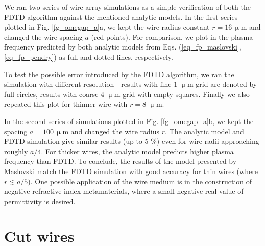We ran two series of wire array simulations as a simple verification of both the FDTD algorithm against the mentioned analytic models. In the first series plotted in Fig. \ref{fg_omegap_a}a, we kept the wire radius constant $r = 16\,\upmu$m  and changed the wire spacing $a$ (red points). For comparison, we plot in the plasma frequency predicted by both analytic models from Eqs. (\ref{eq_fp_maslovski}, \ref{eq_fp_pendry}) as full and dotted lines, respectively. 

To test the possible error introduced by the FDTD algorithm, we ran the simulation with different resolution - results with fine $1$ $\upmu$m grid are denoted by full circles, results with coarse $4$ $\upmu$m grid with empty squares. Finally we also repeated this plot for thinner wire with $r = 8$ $\upmu$m. %

In the second series of simulations plotted in Fig.  \ref{fg_omegap_a}b, we kept the spacing $a = 100\,\upmu$m and changed the wire radius $r$. The analytic model and FDTD simulation give similar results (up to 5 \%) even for wire radii approaching roughly $a/4$. For thicker wires, the analytic model predicts higher plasma frequency than FDTD.  To conclude, the results of the model presented by Maslovski match the FDTD simulation with good accuracy for thin wires (where $r \lesssim a/5$). One possible application of the wire medium is in the construction of negative refractive index metamaterials, where a small negative real value of permittivity is desired.%


\FloatBarrier
	


\section{Cut wires} \label{section_cutwires} %

